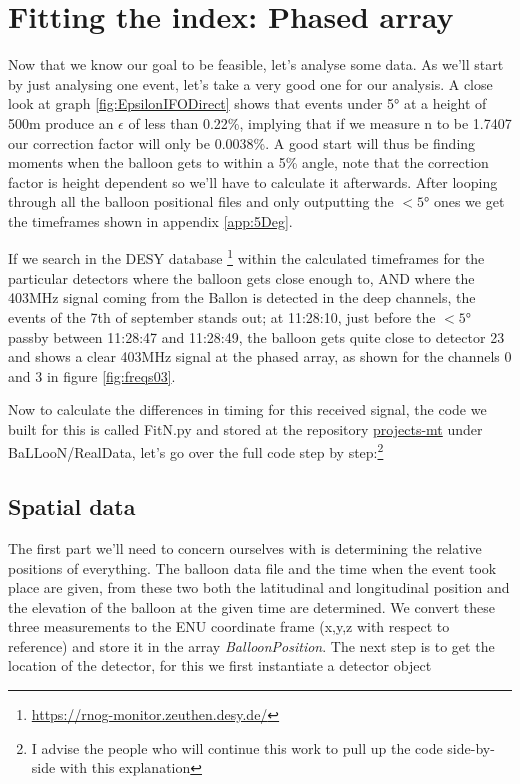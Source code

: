 \documentclass[11pt,a4paper,faculty=we,language=en,doctype=report]{cls/ugent-doc}
\begin{document}
\section{Fitting the index: Phased array}
Now that we know our goal to be feasible, let's analyse some data.  As we'll
start by just analysing one event, let's take a very good one for our analysis.
A close look at graph \ref{fig:EpsilonIFODirect} shows that events under 5° at
a height of 500m produce an $\epsilon$ of less than 0.22\%, implying that if we
measure n to be 1.7407 our correction factor will only be 0.0038\%.  A good start will
thus be finding moments when the balloon gets to within a 5\% angle, note that
the correction factor is height dependent so we'll have to calculate it afterwards.  After
looping through all the balloon positional files and only outputting the $<5$°
ones we get the timeframes shown in appendix \ref{app:5Deg}.

If we search in the DESY database
\footnote{\url{https://rnog-monitor.zeuthen.desy.de/}} within the calculated
timeframes for the particular detectors where the balloon gets close enough to,
AND where the 403MHz signal coming from the Ballon is detected in the deep channels, the events of the 7th
of september stands out; at 11:28:10,  just before the $<5$° passby between
11:28:47 and 11:28:49, the balloon gets quite close to detector 23 and shows a
clear 403MHz signal at the phased array, as shown for the channels 0 and 3 in
figure \ref{fig:freqs03}.

Now to calculate the differences in timing for this received signal, the code
we built for this is called FitN.py and stored at the repository
\href{https://github.com/arthuradriaens-code/projects-mt.git}{projects-mt}
under BaLLooN/RealData, let's go over the full code step by step:\footnote{I advise 
the people who will continue this work to pull up the code side-by-side with this 
explanation}

\subsection{Spatial data}
The first part we'll need to concern ourselves with is determining the relative
positions of everything. The balloon data file and the time when the event took
place are given, from these two both the latitudinal and longitudinal position
and the elevation of the balloon at the given time are determined. We convert
these three measurements to the ENU coordinate frame (x,y,z with respect to
reference) and store it in the array \textit{BalloonPosition}. The next step is
to get the location of the detector, for this we first instantiate a detector
object 
\end{document}
